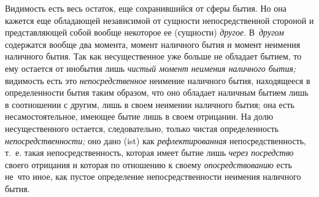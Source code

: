 Видимость есть весь остаток, еще сохранившийся от сферы бытия. Но она
кажется еще обладающей независимой от сущности непосредственной стороной и
представляющей собой вообще некоторое ее (сущности)
{\em другое}. В~{\em другом}
содержатся вообще два момента, момент наличного бытия и момент неимения
наличного бытия. Так как несущественное уже больше не обладает бытием, то
ему остается от инобытия лишь {\em чистый момент
неимения наличного бытия;} видимость есть это
{\em непосредственное} неимение наличного бытия,
находящееся в определенности бытия таким образом, что оно обладает наличным
бытием лишь в соотношении с другим, лишь в своем неимении наличного бытия;
она есть несамостоятельное, имеющее бытие лишь в своем отрицании. На долю
несущественного остается, следовательно, только чистая определенность
{\em непосредственности;} оно дано (ist) как
{\em рефлектированная} непосредственность, т.~е. такая
непосредственность, которая имеет бытие лишь {\em через
посредство} своего отрицания и которая по отношению к своему
{\em опосредствованию} есть не~что иное, как пустое
определение непосредственности неимения наличного бытия.

